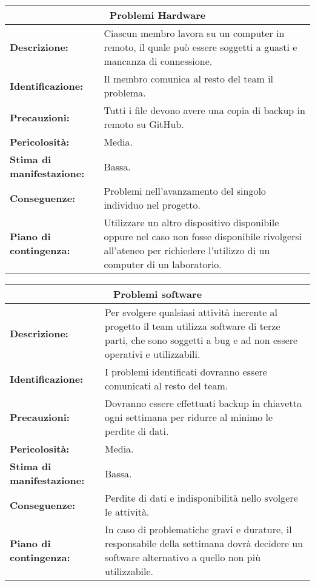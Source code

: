 \vspace{20pt}

\begin{tabular}{ |p{4cm}|p{10cm}|}
\hline
\multicolumn{2}{|c|}{\textbf{Problemi Hardware}} \\
\hline
\textbf{Descrizione:}& Ciascun membro lavora su un computer in remoto, il quale può essere soggetti a guasti e mancanza di connessione.\\
\hline
\textbf{Identificazione:}& Il membro comunica al resto del team il problema.\\
\hline
\textbf{Precauzioni:}& Tutti i file devono avere una copia di backup in remoto su GitHub.\\
\hline
\textbf{Pericolosità:}& Media.\\
\hline
\textbf{Stima di manifestazione:}& Bassa.\\
\hline
\textbf{Conseguenze:}& Problemi nell'avanzamento del singolo individuo nel progetto.\\
\hline
\textbf{Piano di contingenza:}& Utilizzare un altro dispositivo disponibile oppure nel caso non fosse disponibile rivolgersi all'ateneo per richiedere l'utilizzo di un computer di un laboratorio.\\
\hline
\end{tabular}

\vspace{20pt}

\begin{tabular}{ |p{4cm}|p{10cm}|}
\hline
\multicolumn{2}{|c|}{\textbf{Problemi software}} \\
\hline
\textbf{Descrizione:}& Per svolgere qualsiasi attività inerente al progetto il team utilizza software di terze parti, che sono soggetti a bug e ad non essere operativi e utilizzabili.\\
\hline
\textbf{Identificazione:}& I problemi identificati dovranno essere comunicati al resto del team.\\
\hline
\textbf{Precauzioni:}& Dovranno essere effettuati backup in chiavetta ogni settimana per ridurre al minimo le perdite di dati.\\
\hline
\textbf{Pericolosità:}& Media.\\
\hline
\textbf{Stima di manifestazione:}& Bassa.\\
\hline
\textbf{Conseguenze:}& Perdite di dati e indisponibilità nello svolgere le attività.\\
\hline
\textbf{Piano di contingenza:}& In caso di problematiche gravi e durature, il responsabile della settimana dovrà decidere un software alternativo a quello non più utilizzabile.\\
\hline
\end{tabular}

